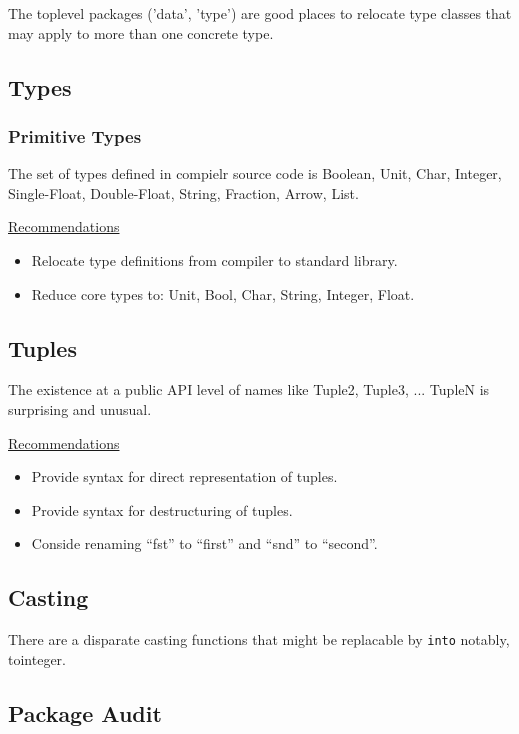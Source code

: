 \documentclass[12pt]{article}
\newcommand{\code}{\texttt}
\begin{document}
The toplevel packages ('data', 'type') are good places to relocate
type classes that may apply to more than one concrete type.

\subsection{Types}

\subsubsection{Primitive Types}

The set of types defined in compielr source code is Boolean, Unit,
Char, Integer, Single-Float, Double-Float, String, Fraction, Arrow,
List. 

\bigskip
\underline{Recommendations}
\begin{itemize}
\item Relocate type definitions from compiler to standard library.
\item Reduce core types to: Unit, Bool, Char, String, Integer, Float.
\end{itemize}

\subsection{Tuples}

The existence at a public API level of names like Tuple2, Tuple3,
... TupleN is surprising and unusual.

\bigskip
\underline{Recommendations}
\begin{itemize}
\item Provide syntax for direct representation of tuples.
\item Provide syntax for destructuring of tuples.
\item Conside renaming ``fst'' to ``first'' and ``snd'' to ``second''.
\end{itemize}

\subsection{Casting}

There are a disparate casting functions that might be
replacable by \code{into} notably, tointeger.

\subsection{Package Audit}
\end{document}
